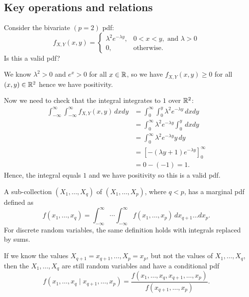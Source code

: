 \documentclass[10pt, a4paper]{article}
\begin{document}
\subsection{Key operations and relations}
\begin{example}
    Consider the bivariate
    $(p = 2)$ pdf:
    \[
    f_{X, Y}(x, y) = \begin{cases}
        \lambda ^ 2e ^ {-\lambda y}, &0 < x < y,\text{ and } \lambda > 0 \\
        0, &\text{otherwise}.
    \end{cases}
    \]
    Is this a valid pdf?

    \begin{solution}
        We know $\lambda ^ 2 > 0$ and $e ^ x > 0$ for all $x \in \mathbb{R}$,
        so we have $f_{X, Y}(x, y) \geq 0$ for all $(x, y) \in \mathbb{R} ^ 2$ hence we have positivity.

        Now we need to check that the integral integrates to $1$ over $\mathbb{R} ^ 2$:
        \begin{align*}
            \int_{-\infty}^{\infty}\int_{-\infty}^{\infty}f_{X, Y}(x, y)\,dxdy &= \int_{0}^{\infty}\int_{0}^{y}\lambda ^ 2e ^ {-\lambda y}\,dxdy \\
            &= \int_{0}^{\infty}\lambda ^ 2e ^ {-\lambda y}\int_{0}^{y}\,dxdy \\
            &= \int_{0}^{\infty}\lambda ^ 2e ^ {-\lambda y}y\,dy \\
            &= \left[-(\lambda y + 1)e ^ {-\lambda y}\right]_{0}^{\infty} \\
            &= 0 - (-1) = 1.
        \end{align*}
        Hence,
        the integral equals $1$ and we have positivity so this is a valid pdf.
    \end{solution}
\end{example}

\begin{definition}
    A sub-collection $(X_1, \dotsc, X_q)$ of $(X_1, \dotsc, X_p)$,
    where $q < p$,
    has a marginal pdf defined as
    \[
    f(x_1, \dotsc, x_q) = \int_{-\infty}^{\infty}\dotsi\int_{-\infty}^{\infty}f(x_1, \dotsc, x_p)\,dx_{q + 1}\dotsc dx_p. 
    \]
    For discrete random variables,
    the same definition holds with integrals replaced by sums.
\end{definition}

\begin{definition}
    If we know the values $X_{q + 1} = x_{q + 1}, \dotsc, X_p = x_p$,
    but not the values of $X_1, \dotsc, X_q$,
    then the $X_1, \dotsc, X_q$ are still random variables and have a conditional pdf
    \[
    f(x_1, \dotsc, x_q\mid x_{q + 1}, \dotsc, x_p) = \frac{f(x_1, \dotsc, x_q, x_{q + 1}, \dotsc, x_p)}{f(x_{q + 1}, \dotsc, x_p)}.
    \]
\end{definition}
\end{document}
